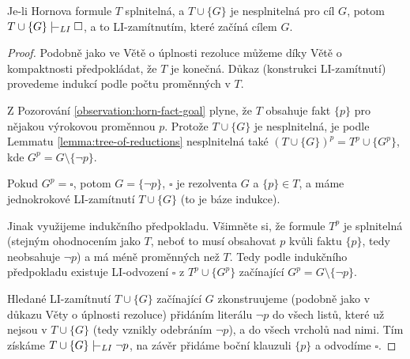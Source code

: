 \begin{theorem}\label{theorem:completeness-of-li-resolution-for-horn}
Je-li Hornova formule $T$ splnitelná, a $T\cup\{G\}$ je nesplnitelná pro cíl $G$, potom $T\cup\{G\}\proves_{LI}\square$, a to LI-zamítnutím, které začíná cílem $G$.   
\end{theorem}
\begin{proof}
    Podobně jako ve Větě o úplnosti rezoluce můžeme díky Větě o kompaktnosti předpokládat, že $T$ je konečná. Důkaz (konstrukci LI-zamítnutí) provedeme indukcí podle počtu proměnných v $T$.

    Z Pozorování \ref{observation:horn-fact-goal} plyne, že $T$ obsahuje fakt $\{p\}$ pro nějakou výrokovou proměnnou $p$. Protože $T\cup\{G\}$ je nesplnitelná, je podle Lemmatu \ref{lemma:tree-of-reductions} nesplnitelná také $(T\cup\{G\})^p=T^p\cup\{G^p\}$, kde $G^p=G\setminus\{\neg p\}$.
    
    Pokud $G^p=\square$, potom $G=\{\neg p\}$, $\square$ je rezolventa $G$ a $\{p\}\in T$, a máme jednokrokové LI-zamítnutí $T\cup\{G\}$ (to je báze indukce). 
    
    Jinak využijeme indukčního předpokladu. Všimněte si, že formule $T^p$ je splnitelná (stejným ohodnocením jako $T$, neboť to musí obsahovat $p$ kvůli faktu $\{p\}$, tedy neobsahuje $\neg p$) a má méně proměnných než $T$. Tedy podle indukčního předpokladu existuje LI-odvození $\square$ z $T^p\cup\{G^p\}$ začínající $G^p=G\setminus\{\neg p\}$.

    Hledané LI-zamítnutí $T\cup\{G\}$ začínající $G$ zkonstruujeme (podobně jako v důkazu Věty o úplnosti rezoluce) přidáním literálu $\neg p$ do všech listů, které už nejsou v $T\cup\{G\}$ (tedy vznikly odebráním $\neg p$), a do všech vrcholů nad nimi. Tím získáme $T\cup\{G\}\proves_{LI}\neg p$, na závěr přidáme boční klauzuli $\{p\}$ a odvodíme $\square$.
\end{proof}


